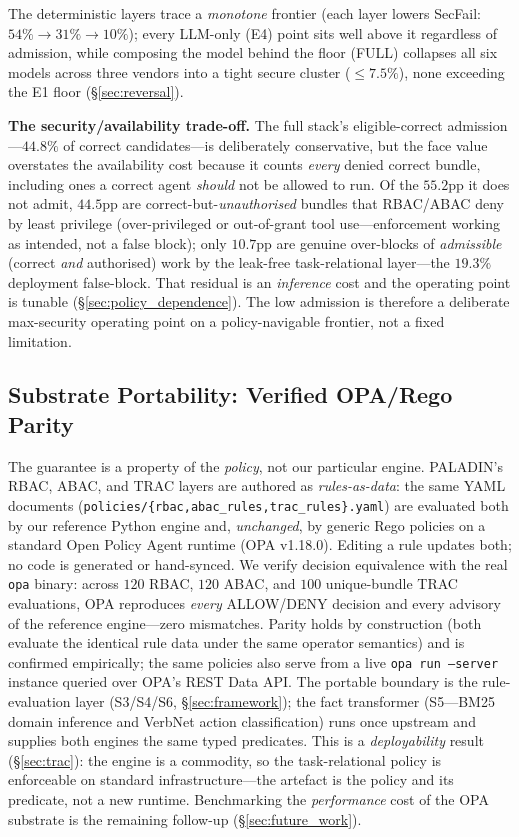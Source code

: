 \documentclass[sigconf,review,anonymous]{acmart}
\begin{document}
The deterministic layers trace a \emph{monotone} frontier (each layer lowers SecFail: $54\%\!\to\!31\%\!\to\!10\%$); every LLM-only (E4) point sits well above it regardless of admission, while composing the model behind the floor (FULL) collapses all six models across three vendors into a tight secure cluster ($\leq7.5\%$), none exceeding the E1 floor (\S\ref{sec:reversal}).

\textbf{The security/availability trade-off.} The full stack's eligible-correct admission---$44.8\%$ of correct candidates---is deliberately conservative, but the face value overstates the availability cost because it counts \emph{every} denied correct bundle, including ones a correct agent \emph{should} not be allowed to run. Of the $55.2$pp it does not admit, $44.5$pp are correct-but-\emph{unauthorised} bundles that RBAC/ABAC deny by least privilege (over-privileged or out-of-grant tool use---enforcement working as intended, not a false block); only $10.7$pp are genuine over-blocks of \emph{admissible} (correct \emph{and} authorised) work by the leak-free task-relational layer---the $19.3\%$ deployment false-block. That residual is an \emph{inference} cost and the operating point is tunable (\S\ref{sec:policy_dependence}). The low admission is therefore a deliberate max-security operating point on a policy-navigable frontier, not a fixed limitation.

\subsection{Substrate Portability: Verified OPA/Rego Parity}
\label{sec:substrate_portability}

The guarantee is a property of the \emph{policy}, not our particular engine. PALADIN's RBAC, ABAC, and TRAC layers are authored as \emph{rules-as-data}: the same YAML documents (\texttt{policies/\{rbac,abac\_rules,trac\_rules\}.yaml}) are evaluated both by our reference Python engine and, \emph{unchanged}, by generic Rego policies on a standard Open Policy Agent runtime (OPA v1.18.0). Editing a rule updates both; no code is generated or hand-synced. We verify decision equivalence with the real \texttt{opa} binary: across $120$ RBAC, $120$ ABAC, and $100$ unique-bundle TRAC evaluations, OPA reproduces \emph{every} ALLOW/DENY decision and every advisory of the reference engine---zero mismatches. Parity holds by construction (both evaluate the identical rule data under the same operator semantics) and is confirmed empirically; the same policies also serve from a live \texttt{opa run --server} instance queried over OPA's REST Data API. The portable boundary is the rule-evaluation layer (S3/S4/S6, \S\ref{sec:framework}); the fact transformer (S5---BM25 domain inference and VerbNet action classification) runs once upstream and supplies both engines the same typed predicates. This is a \emph{deployability} result (\S\ref{sec:trac}): the engine is a commodity, so the task-relational policy is enforceable on standard infrastructure---the artefact is the policy and its predicate, not a new runtime. Benchmarking the \emph{performance} cost of the OPA substrate is the remaining follow-up (\S\ref{sec:future_work}).
\end{document}
